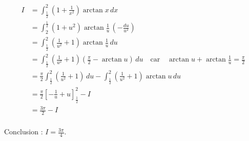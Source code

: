 {\begin{enumerate}
{\begin{align*}
I &= \int_{\frac 12}^2\left( 1+\frac 1{x^2}\right) \arctan x \, dx  \\
  &= \int_2^{\frac 12}\left( 1+u^2 \right) \arctan \frac 1u  \, \left(-\frac{du}{u^2}\right)  \\
  &= \int_{\frac 12}^2 \left( \frac1{u^2} + 1\right) \arctan \frac 1u  \, du  \\
  &= \int_{\frac 12}^2 \left( \frac1{u^2} + 1\right) \left( \frac \pi 2 - \arctan u \right)   \, du  \quad \text{car} \quad \arctan u+\arctan \frac1u=\frac\pi2\\
  &= \frac \pi 2\int_{\frac 12}^2 \left( \frac1{u^2} + 1 \right)\, du  -  \int_{\frac 12}^2  \left( \frac1{u^2} + 1\right)\arctan u  \, du  \\  
  &= \frac \pi 2 \left[ -\frac1{u} + u\right]_{\frac 12}^2  -  I \\  
  &= \frac{3\pi}{2} - I\\
\end{align*}

Conclusion : $I = \frac{3\pi}{4}.$}
\end{enumerate}
}